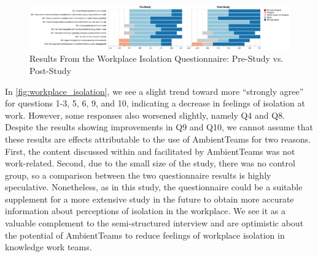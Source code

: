 \begin{figure}[h]
    \centering
    \includegraphics[width=\linewidth]{plots/workplace_isolation_likert.pdf}
    \caption{Results From the Workplace Isolation Questionnaire: Pre-Study vs. Post-Study}
    \label{fig:workplace_isolation}
\end{figure}

In \autoref{fig:workplace_isolation}, we see a slight trend toward more \enquote{strongly agree} for questions 1-3, 5, 6, 9, and 10, indicating a decrease in feelings of isolation at work. However, some responses also worsened slightly, namely Q4 and Q8. Despite the results showing improvements in Q9 and Q10, we cannot assume that these results are effects attributable to the use of AmbientTeams for two reasons. First, the content discussed within and facilitated by AmbientTeams was not work-related. Second, due to the small size of the study, there was no control group, so a comparison between the two questionnaire results is highly speculative. Nonetheless, as in this study, the questionnaire could be a suitable supplement for a more extensive study in the future to obtain more accurate information about perceptions of isolation in the workplace. We see it as a valuable complement to the semi-structured interview and are optimistic about the potential of AmbientTeams to reduce feelings of workplace isolation in knowledge work teams.



